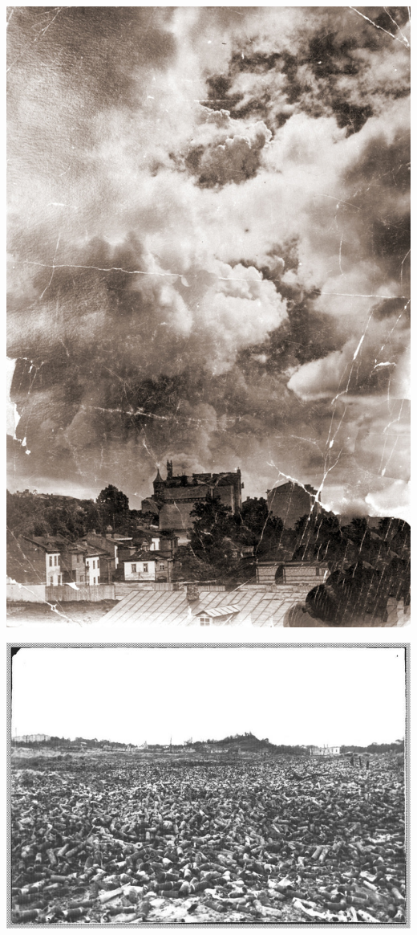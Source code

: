 \newpage
\vspace*{\fill}
\begin{center}
\includegraphics[width=\textwidth]{chast-vosp/zver/vzryv.jpg}
\end{center}
\vspace*{\fill}
\newpage

\vspace*{\fill}
\begin{center}
\includegraphics[width=\textwidth]{chast-vosp/zver/vz001.jpg}
\end{center}

